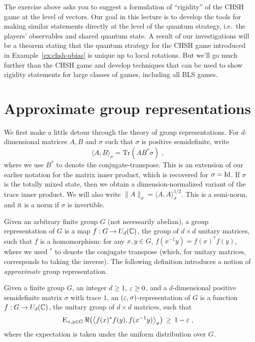 The exercise above asks you to suggest a formulation of ``rigidity'' of the CHSH game at the level of vectors. Our goal in this lecture is to develop the tools for making similar statements directly at the level of the quantum strategy, i.e.\ the players' observables and shared quantum state. A result of our investigations will be a theorem stating that the quantum strategy for the CHSH game introduced in Example~\ref{ex:chsh-qbias} is  unique up to local rotations. But we'll go much further than the CHSH game and develop techniques that can be used to show rigidity statements for large classes of games, including all BLS games. 


\section{Approximate group representations}
\label{sec:approx-group}

We first make a little detour through the theory of group representations. For $d$-dimensional matrices  $A,B$ and $\sigma$ such that $\sigma$ is positive semidefinite, write 
$$\langle A,B\rangle_\sigma = \mathrm{Tr}(AB^* \sigma)\;,$$
where we use $B^*$ to denote the conjugate-transpose. This is an extension of our earlier notation for the matrix inner product, which is recovered for $\sigma = \mathop{\rm Id}\nolimits$. If $\sigma$ is the totally mixed state, then we obtain a dimension-normalized variant of the trace inner product. We will also write $\|A\|_\sigma = \langle A,A\rangle_\sigma^{1/2}$. This is a semi-norm, and it is a norm if $\sigma$ is invertible. 

Given an arbitrary finite group $G$ (not necessarily abelian), a group representation of $G$ is a map $f:G \to U_d(\mathbb{C})$, the group of $d\times d$ unitary matrices, such that $f$ is a homomorphism: for any $x,y\in G$, $f(x^{-1}y)=f(x)^* f(y)$, where we used $^*$ to denote the conjugate transpose (which, for unitary matrices, corresponds to taking the inverse). The following definition introduces a notion of \emph{approximate} group representation.  

\begin{definition}\label{def:approx-rep}
Given a finite group $G$, an integer $d\geq 1$, $\varepsilon\geq 0$, and a $d$-dimensional positive semidefinite matrix $\sigma$ with trace $1$, an $(\varepsilon,\sigma)$-representation of $G$ is a function $f: G \to U_d(\mathbb{C})$, the unitary group of $d\times d$ matrices, such that 
\begin{equation}\label{eq:gh-condition}
\textsc{E}_{x,y\in G} \,\Re\big(\big\langle f(x)^*f(y) ,f(x^{-1}y) \big\rangle_\sigma\big) \,\geq\, 1-\varepsilon\;,
\end{equation} 
where the expectation is taken under the uniform distribution over $G$.
\end{definition}

